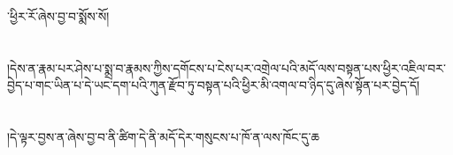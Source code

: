 ་ཕྱིར་རོ་ཞེས་བྱ་བ་སྨོས་སོ།\chapter{ }།དེས་ན་རྣམ་པར་ཤེས་པ་སྨྲ་བ་རྣམས་ཀྱིས་དགོངས་པ་ངེས་པར་འགྲེལ་པའི་མདོ་ལས་བསྟན་པས་ཕྱིར་འཇིལ་བར་བྱེད་པ་གང་ཡིན་པ་དེ་ཡང་དག་པའི་ཀུན་རྫོབ་ཏུ་བསྟན་པའི་ཕྱིར་མི་འགལ་བ་ཉིད་དུ་ཞེས་སྟོན་པར་བྱེད་དོ།\chapter{ }།དེ་ལྟར་བྱས་ན་ཞེས་བྱ་བ་ནི་ཚིག་དེ་ནི་མདོ་དེར་གསུངས་པ་ཁོ་ན་ལས་ཁོང་དུ་ཆ